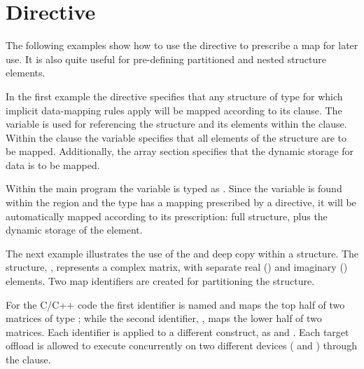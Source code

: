 \section{ Directive}
\label{sec:declare_mapper}

The following examples show how to use the 
directive to prescribe a map for later use.
It is also quite useful for pre-defining partitioned and nested 
structure elements.

In the first example the  directive specifies
that any structure of type  for which implicit data-mapping
rules apply will be mapped according to its  clause.
The variable  is used for referencing the structure and its 
elements within the  clause. 
Within the  clause the  variable specifies that all
elements of the structure are to be mapped.  Additionally, the
array section  specifies that the dynamic 
storage for data is to be mapped. 

Within the main program the  variable is typed as .
Since the variable is found within the  region and the type has a mapping prescribed by
a  directive, it will be automatically mapped according to its prescription:
full structure, plus the dynamic storage of the  element. 




{}
The next example illustrates the use of the  and deep copy within a structure. 
The structure, ,  represents a complex matrix, 
with separate real () and imaginary () elements.
Two map identifiers are created for partitioning the  structure.

For the C/C++ code the first identifier is named  and maps the top half of
two matrices of type ; while the second identifier, ,
maps the lower half of two matrices. 
Each identifier is applied to a different  construct,
as   
and .
Each target offload is allowed to execute concurrently on two different devices 
( and ) through the  clause.

